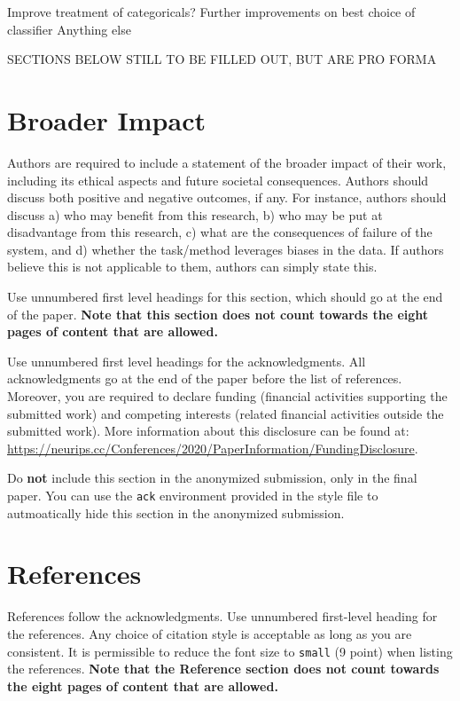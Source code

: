 \documentclass{article}
\begin{document}
Improve treatment of categoricals?  
Further improvements on best choice of classifier  
Anything else  

SECTIONS BELOW STILL TO BE FILLED OUT, BUT ARE PRO FORMA


\section*{Broader Impact}

Authors are required to include a statement of the broader impact of their work, including its ethical aspects and future societal consequences. 
Authors should discuss both positive and negative outcomes, if any. For instance, authors should discuss a) 
who may benefit from this research, b) who may be put at disadvantage from this research, c) what are the consequences of failure of the system, and d) whether the task/method leverages
biases in the data. If authors believe this is not applicable to them, authors can simply state this.

Use unnumbered first level headings for this section, which should go at the end of the paper. {\bf Note that this section does not count towards the eight pages of content that are allowed.}

\begin{ack}
Use unnumbered first level headings for the acknowledgments. All acknowledgments
go at the end of the paper before the list of references. Moreover, you are required to declare 
funding (financial activities supporting the submitted work) and competing interests (related financial activities outside the submitted work). 
More information about this disclosure can be found at: \url{https://neurips.cc/Conferences/2020/PaperInformation/FundingDisclosure}.


Do {\bf not} include this section in the anonymized submission, only in the final paper. You can use the \texttt{ack} environment provided in the style file to autmoatically hide this section in the anonymized submission.
\end{ack}

\section*{References}

References follow the acknowledgments. Use unnumbered first-level heading for
the references. Any choice of citation style is acceptable as long as you are
consistent. It is permissible to reduce the font size to \verb+small+ (9 point)
when listing the references.
{\bf Note that the Reference section does not count towards the eight pages of content that are allowed.}
\medskip


\end{document}
